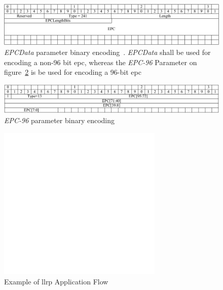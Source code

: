 \begin{figure}[]
    \centering
    \includegraphics[width=\textwidth]{./figs/02-state-of-the-art/EPCDataParameter_bin.pdf}
    \caption{\textit{EPCData} parameter binary encoding~\cite{LowLevelReader}. \textit{EPCData} shall be used for encoding a non-96 bit \ac{epc}, whereas the \textit{EPC-96} Parameter on figure~\ref{fig:EPC96bin} is be used for encoding a 96-bit \ac{epc}} 
    \label{fig:EPCDatabin}
\end{figure}

\begin{figure}[]
    \centering
    \includegraphics[width=\textwidth]{./figs/02-state-of-the-art/EPC96ParameterTVEncoding_bin.pdf}
    \caption{\textit{EPC-96} parameter binary encoding~\cite{LowLevelReader}} 
    \label{fig:EPC96bin}
\end{figure}

\begin{figure}[]
    \centering
    \includegraphics[width=0.7\textwidth]{./figs/02-state-of-the-art/llrpflow.pdf}
    \caption{Example of \ac{llrp} Application Flow~\cite{ImpinjLTKProgrammers}} 
    \label{fig:llrpflow}
\end{figure}

